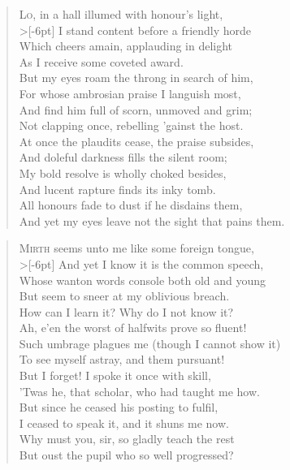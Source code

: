 \documentclass[a5paper, 12pt, oneside]{memoir}
\begin{document}
\PoemTitle{}
\begin{verse}
    \lettrine{L}{o}, in a hall illumed with honour's light, \\>[-6pt]
    I stand content before a friendly horde \\
    Which cheers amain, applauding in delight \\
    As I receive some coveted award. \\
    But my eyes roam the throng in search of him, \\
    For whose ambrosian praise I languish most, \\
    And find him full of scorn, unmoved and grim; \\
    Not clapping once, rebelling 'gainst the host. \\
    At once the plaudits cease, the praise subsides, \\
    And doleful darkness fills the silent room; \\
    My bold resolve is wholly choked besides, \\
    And lucent rapture finds its inky tomb. \\
    \vin All honours fade to dust if he disdains them, \\
    \vin And yet my eyes leave not the sight that pains them.
\end{verse}

\PoemTitle{}
\begin{verse}
    \lettrine{M}{irth} seems unto me like some foreign tongue, \\>[-6pt]
    And yet I know it is the common speech, \\
    Whose wanton words console both old and young \\
    But seem to sneer at my oblivious breach. \\
    How can I learn it? Why do I not know it? \\
    Ah, e'en the worst of halfwits prove so fluent! \\
    Such umbrage plagues me (though I cannot show it) \\
    To see myself astray, and them pursuant! \\
    But I forget! I spoke it once with skill, \\
    'Twas he, that scholar, who had taught me how. \\
    But since he ceased his posting to fulfil, \\
    I ceased to speak it, and it shuns me now. \\
    \vin Why must you, sir, so gladly teach the rest \\
    \vin But oust the pupil who so well progressed?
\end{verse}
\end{document}
